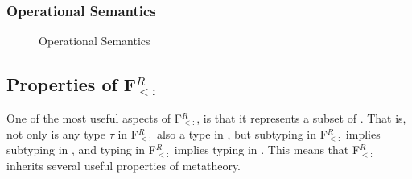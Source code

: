\documentclass[runningheads, anon]{llncs}
\begin{document}
\subsubsection{Operational Semantics}
\begin{figure}[t]
\caption{\Fsub Operational Semantics}
\label{f:opSemantics}
\end{figure}



\subsection{Properties of F$_{<:}^R$}

One of the most useful aspects of F$_{<:}^R$, is that it represents a subset of \Fsub.
That is, not only is any type $\tau$ in F$_{<:}^R$ also a type in \Fsub, but subtyping in F$_{<:}^R$
implies subtyping in \Fsub, and typing in F$_{<:}^R$ implies typing in \Fsub. This means that F$_{<:}^R$
inherits several useful properties of \Fsub metatheory.
\end{document}
